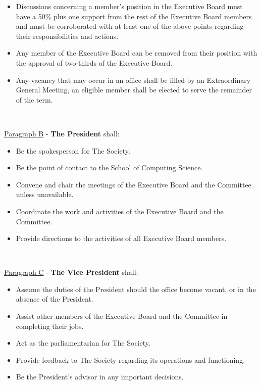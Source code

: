 \begin{itemize}
    \item{Discussions concerning a member's position in the Executive Board must have a 50\% plus one support from the rest of the Executive Board members and must be corroborated with at least one of the above points regarding their responsibilities and actions.}

    \item{Any member of the Executive Board can be removed from their position with the approval of two-thirds of the Executive Board.}

    \item{Any vacancy that may occur in an office shall be filled by an Extraordinary General Meeting, an eligible member shall be elected to serve the remainder of the term. }

\end{itemize}

~

\underline{Paragraph B} - \textbf{The President} shall:

\begin{itemize}

    \item{Be the spokesperson for The Society.}

    \item{Be the point of contact to the School of Computing Science.}

    \item{Convene and chair the meetings of the Executive Board and the Committee unless unavailable.}

    \item{Coordinate the work and activities of the Executive Board and the Committee.}

    \item{Provide directions to the activities of all Executive Board members.}

\end{itemize}

~

\underline{Paragraph C} - \textbf{The Vice President} shall:

\begin{itemize}

    \item{Assume the duties of the President should the office become vacant, or in the absence of the President.}

    \item{Assist other members of the Executive Board and the Committee in completing their jobs.}

    \item{Act as the parliamentarian for The Society.}

    \item{Provide feedback to The Society regarding its operations and functioning.}

    \item{Be the President's advisor in any important decisions.}

\end{itemize}

